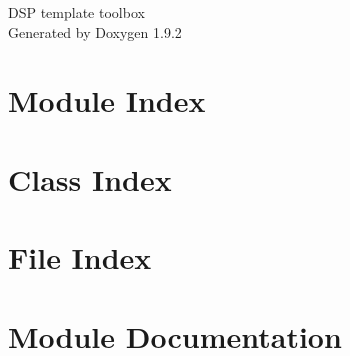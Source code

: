 \documentclass[twoside]{book}
\newcommand{\+}{\discretionary{\mbox{\scriptsize$\hookleftarrow$}}{}{}}
\newcommand{\clearemptydoublepage}{%
    \newpage{\pagestyle{empty}\cleardoublepage}%
  }
\begin{document}
  \raggedbottom
    \hypersetup{pageanchor=false,
                bookmarksnumbered=true,
                pdfencoding=unicode
               }
  \begin{titlepage}
  \vspace*{7cm}
  \begin{center}%
  {\Large DSP template toolbox}\\
  \vspace*{1cm}
  {\large Generated by Doxygen 1.9.2}\\
  \end{center}
  \end{titlepage}
  \clearemptydoublepage
  \tableofcontents
  \clearemptydoublepage
  \hypersetup{pageanchor=true}
\chapter{Module Index}

\chapter{Class Index}

\chapter{File Index}

\chapter{Module Documentation}








\end{document}
